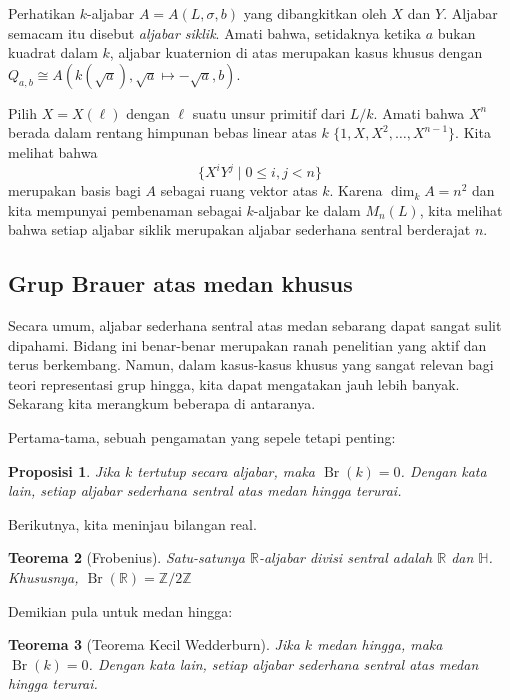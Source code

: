 \documentclass[12pt]{article}
\theoremstyle{plain}
\newtheorem{theorem}{Teorema}[section]
\newtheorem{proposition}[theorem]{Proposisi}
\theoremstyle{definition}
\theoremstyle{remark}
\numberwithin{equation}{section}
\begin{document}
Perhatikan $k$-aljabar $A=A(L,\sigma,b)$ yang dibangkitkan oleh $X$ dan $Y$.
Aljabar semacam itu disebut \emph{aljabar siklik}.
Amati bahwa, setidaknya ketika $a$ bukan kuadrat dalam $k$,
aljabar kuaternion di atas merupakan kasus khusus
dengan $Q_{a,b} \cong A(k(\sqrt{a}),\sqrt{a}\mapsto -\sqrt{a},b)$.

Pilih $X=X(\ell)$ dengan $\ell$ suatu unsur primitif dari $L/k$.
Amati bahwa $X^n$ berada dalam rentang himpunan bebas linear atas $k$
$\{1,X,X^2,\ldots,X^{n-1}\}$.
Kita melihat bahwa
\[
\{ X^iY^j \mid 0 \le i,j < n \}
\]
merupakan basis bagi $A$ sebagai ruang vektor atas $k$.
Karena $\dim_k A = n^2$ dan kita mempunyai pembenaman sebagai $k$-aljabar
ke dalam $M_n(L)$, kita melihat bahwa setiap aljabar siklik merupakan aljabar sederhana
sentral berderajat $n$.

\subsection{Grup Brauer atas medan khusus}

Secara umum, aljabar sederhana sentral atas medan sebarang dapat sangat
sulit dipahami. Bidang ini benar-benar merupakan ranah penelitian yang
aktif dan terus berkembang. Namun, dalam kasus-kasus khusus yang sangat relevan
bagi teori representasi grup hingga, kita dapat mengatakan jauh
lebih banyak. Sekarang kita merangkum beberapa di antaranya.

Pertama-tama, sebuah pengamatan yang sepele tetapi penting:

\begin{proposition}
Jika $k$ tertutup secara aljabar, maka $\operatorname{Br}(k)=0$.
Dengan kata lain, setiap aljabar sederhana sentral atas medan hingga terurai. 
\end{proposition}

Berikutnya, kita meninjau bilangan real.

\begin{theorem}[Frobenius]
Satu-satunya $\mathbb{R}$-aljabar divisi sentral adalah
$\mathbb{R}$ dan $\mathbb{H}$.
Khususnya, $\operatorname{Br}(\mathbb{R})=\mathbb{Z}/2\mathbb{Z}$
\end{theorem}

Demikian pula untuk medan hingga:

\begin{theorem}[Teorema Kecil Wedderburn]
Jika $k$ medan hingga, maka $\operatorname{Br}(k)=0$.
Dengan kata lain, setiap aljabar sederhana sentral atas medan hingga terurai.
\end{theorem}
\end{document}

